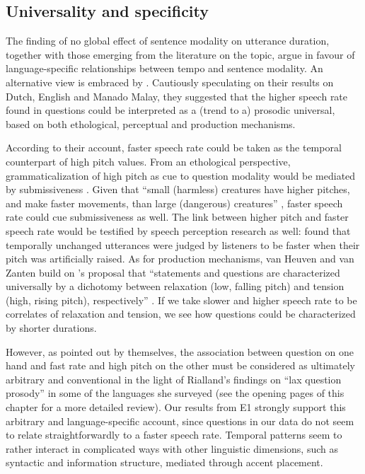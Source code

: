 \subsection{Universality and specificity}\label{sec451}
The finding of no global effect of sentence modality on utterance duration, together with those emerging from the literature on the topic, argue in favour of language-specific relationships between tempo and sentence modality. An alternative view is embraced by \citet{vanheuven2005speech}. Cautiously speculating on their results on Dutch, English and Manado Malay, they suggested that the higher speech rate found in questions could be interpreted as a (trend to a) prosodic universal, based on both ethological, perceptual and production mechanisms. 

According to their account, faster speech rate could be taken as the temporal counterpart of high pitch values. From an ethological perspective, grammaticalization of high pitch as cue to question modality would be mediated by submissiveness \citep{ohala1984ethological,gussenhoven2004phonology}. Given that ``small (harmless) creatures have higher pitches, and make faster movements, than large (dangerous) creatures'' \citep[97]{vanheuven2005speech}, faster speech rate could cue submissiveness as well. The link between higher pitch and faster speech rate would be testified by speech perception research as well: \citet{rietveld1987perceived} found that temporally unchanged utterances were judged by listeners to be faster when their pitch was artificially raised. As for production mechanisms, van Heuven and van Zanten build on \citeauthor{bolinger1964intonation}'s \citeyearpar{bolinger1964intonation,bolinger1989intonation} proposal that ``statements and questions are characterized universally by a dichotomy between relaxation (low, falling pitch) and tension (high, rising pitch), respectively'' \citep[\textit{ibid.}]{vanheuven2005speech}. If we take slower and higher speech rate to be correlates of relaxation and tension, we see how questions could be characterized by shorter durations. 

However, as pointed out by \citeauthor{vanheuven2005speech} themselves, the association between question on one hand and fast rate and high pitch on the other must be considered as ultimately arbitrary and conventional in the light of Rialland's findings on ``lax question prosody'' in some of the languages she surveyed (see the opening pages of this chapter for a more detailed review). Our results from E1 strongly support this arbitrary and language-specific account, since questions in our data do not seem to relate straightforwardly to a faster speech rate. Temporal patterns seem to rather interact in complicated ways with other linguistic dimensions, such as syntactic and information structure, mediated through accent placement.

